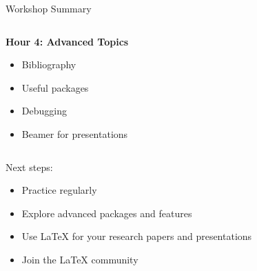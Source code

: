 \begin{frame}{Workshop Summary}
\begin{columns}
\begin{column}{0.5\textwidth}
                              \textbf{Hour 4: Advanced Topics}
                              \begin{itemize}
                                   \item Bibliography
                                   \item Useful packages
                                   \item Debugging
                                   \item Beamer for presentations
                              \end{itemize}
                         \end{column}
                    \end{columns}
                    
                    \begin{alertblock}{Next steps:}
                         \begin{itemize}
                              \item Practice regularly
                              \item Explore advanced packages and features
                              \item Use LaTeX for your research papers and presentations
                              \item Join the LaTeX community
                         \end{itemize}
                    \end{alertblock}
               \end{frame}
               
